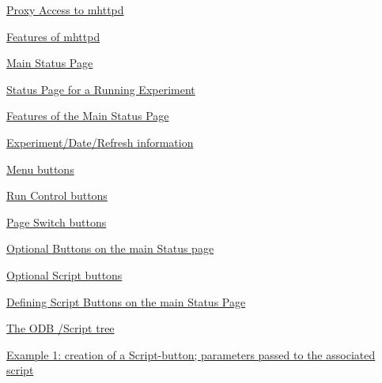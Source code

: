 \begin{TabularC}{2}
\begin{TabularC}{2}
\begin{DoxyItemize}
\begin{DoxyItemize}
\begin{DoxyItemize}
\begin{DoxyItemize}
\begin{DoxyItemize}
\end{DoxyItemize}
\item \hyperlink{RC_mhttpd_utility_RC_mhttpd_proxy}{Proxy Access to mhttpd} 
\end{DoxyItemize}
\begin{DoxyItemize}
\item \hyperlink{RC_mhttpd_RC_mhttpd_functionality}{Features of mhttpd} 
\end{DoxyItemize}
\item \hyperlink{RC_mhttpd_Main_Status_page}{Main Status Page} 
\begin{DoxyItemize}
\item \hyperlink{RC_mhttpd_Main_Status_page_RC_mhttpd_msp_customized}{Status Page for a Running Experiment} 
\item \hyperlink{RC_mhttpd_status_page_features}{Features of the Main Status Page} 
\begin{DoxyItemize}
\item \hyperlink{RC_mhttpd_status_page_features_RC_mhttpd_status_title}{Experiment/Date/Refresh information} 
\item \hyperlink{RC_mhttpd_status_page_features_RC_mhttpd_status_menu_buttons}{Menu buttons} 
\begin{DoxyItemize}
\item \hyperlink{RC_mhttpd_status_page_features_RC_mhttpd_status_RC_buttons}{Run Control buttons} 
\item \hyperlink{RC_mhttpd_status_page_features_RC_mhttpd_status_Page_buttons}{Page Switch buttons} 
\end{DoxyItemize}
\item \hyperlink{RC_mhttpd_status_page_features_RC_mhpptd_optional_buttons}{Optional Buttons on the main Status page} 
\begin{DoxyItemize}
\item \hyperlink{RC_mhttpd_status_page_features_RC_mhttpd_status_script_buttons}{Optional Script buttons} 
\begin{DoxyItemize}
\item \hyperlink{RC_mhttpd_defining_script_buttons}{Defining Script Buttons on the main Status Page} 
\begin{DoxyItemize}
\item \hyperlink{RC_mhttpd_defining_script_buttons_RC_odb_script_tree}{The ODB /Script tree} 
\item \hyperlink{RC_mhttpd_defining_script_buttons_RC_odb_script_example1}{Example 1: creation of a Script-\/button; parameters passed to the associated script} 

\end{DoxyItemize}
\end{DoxyItemize}
\end{DoxyItemize}
\end{DoxyItemize}
\end{DoxyItemize}
\end{DoxyItemize}
\end{DoxyItemize}
\end{DoxyItemize}
\end{TabularC}
\end{TabularC}
